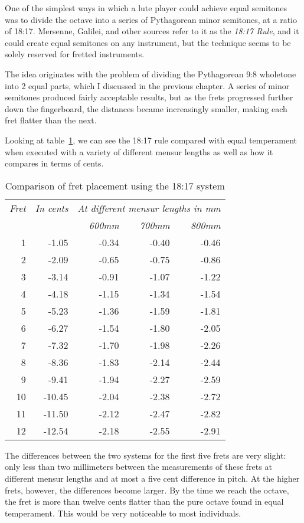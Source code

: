 One of the simplest ways in which a lute player could achieve equal semitones was to
divide the octave into a series of Pythagorean minor semitones, at a ratio of 18:17.
Mersenne, Galilei, and other sources refer to it as the \textit{18:17 Rule}, and it
could create equal semitones on any instrument, but the technique seems to be solely
reserved for fretted instruments.

The idea originates with the problem of dividing the Pythagorean 9:8 wholetone into 2 equal parts,
which I discussed in the previous chapter.  A series of minor semitones produced fairly acceptable
results, but as the frets progressed further down the fingerboard, the distances became increasingly
smaller, making each fret flatter than the next.

Looking at table~\ref{18:17rule}, we can see the 18:17 rule compared with equal temperament
when executed with a variety of different mensur lengths as well as how it
compares in terms of cents.
\begin{table}[h!]
    \begin{center}
    \begin{tabular}{ r r| r r r }
      \textit{Fret} & \textit{In cents} & \multicolumn{3}{c}{\textit{At different mensur lengths in mm}} \\
       &  & \textit{600mm} & \textit{700mm} & \textit{800mm} \\
      \hline
      1  & -1.05  & -0.34 & -0.40 & -0.46 \\
      2  & -2.09  & -0.65 & -0.75 & -0.86 \\
      3  & -3.14  & -0.91 & -1.07 & -1.22 \\
      4  & -4.18  & -1.15 & -1.34 & -1.54 \\
      5  & -5.23  & -1.36 & -1.59 & -1.81 \\
      6  & -6.27  & -1.54 & -1.80 & -2.05 \\
      7  & -7.32  & -1.70 & -1.98 & -2.26 \\
      8  & -8.36  & -1.83 & -2.14 & -2.44 \\
      9  & -9.41  & -1.94 & -2.27 & -2.59 \\
      10 & -10.45 & -2.04 & -2.38 & -2.72 \\
      11 & -11.50 & -2.12 & -2.47 & -2.82 \\
      12 & -12.54 & -2.18 & -2.55 & -2.91 \\
    \end{tabular}
    \end{center}
    \caption{Comparison of fret placement using the 18:17 system}
    \label{18:17rule}
\end{table}
The differences between the two systems for the first five frets are very slight: only
less than two millimeters between the measurements of these frets at different mensur
lengths and at most a five cent difference in pitch.  At the higher frets, however, the
differences become larger.  By the time we reach the octave, the fret is more than
twelve cents flatter than the pure octave found in equal temperament.  This would be
very noticeable to most individuals.

